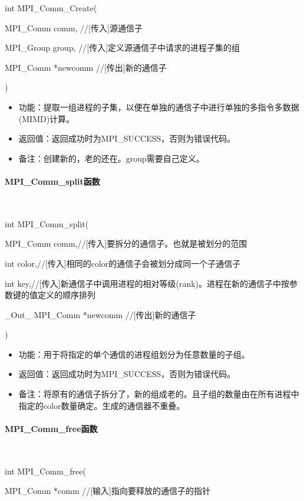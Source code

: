 \documentclass[UTF8]{article}%
\begin{document}
int MPI\_Comm\_Create(
    
    \qquad MPI\_Comm comm, //[传入]源通信子

    \qquad MPI\_Group group, //[传入]定义源通信子中请求的进程子集的组

    \qquad MPI\_Comm *newcomm //[传出]新的通信子
    
    )

\begin{itemize}
    \item 功能：提取一组进程的子集，以便在单独的通信子中进行单独的多指令多数据(MIMD)计算。
    \item 返回值：返回成功时为MPI\_SUCCESS，否则为错误代码。
    \item 备注：创建新的，老的还在。group需要自己定义。
\end{itemize}

\paragraph{MPI\_Comm\_split函数}~{}

int MPI\_Comm\_split(

    \qquad MPI\_Comm comm,//[传入]要拆分的通信子。也就是被划分的范围

    \qquad int color,//[传入]相同的color的通信子会被划分成同一个子通信子

    \qquad int key,//[传入]新通信子中调用进程的相对等级(rank)。进程在新的通信子中按参数键的值定义的顺序排列
    
    \qquad \_Out\_ MPI\_Comm *newcomm //[传出]新的通信子

    )

\begin{itemize}
    \item 功能：用于将指定的单个通信的进程组划分为任意数量的子组。
    \item 返回值：返回成功时为MPI\_SUCCESS，否则为错误代码。
    \item 备注：将原有的通信子拆分了，新的组成老的。且子组的数量由在所有进程中指定的color数量确定。生成的通信器不重叠。
\end{itemize}

\paragraph{MPI\_Comm\_free函数}~{}

int MPI\_Comm\_free(
    
    \qquad MPI\_Comm *comm //[输入]指向要释放的通信子的指针
\end{document}
